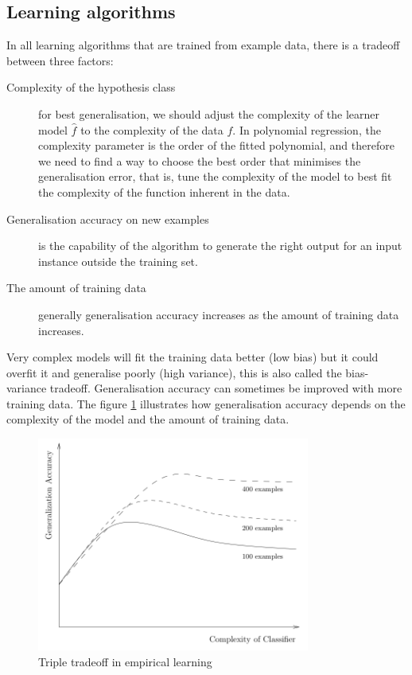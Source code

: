 \subsection{Learning algorithms}
In all learning algorithms that are trained from example data, there is a tradeoff \cite{dietterich2003} between three factors:
\begin{description}
\item[Complexity of the hypothesis class] for best generalisation, we should adjust the complexity of the learner model $\hat{f}$ to the complexity of the data $f$. In polynomial regression, the complexity parameter is the order of the fitted polynomial, and therefore we need to find a way to choose the best order that minimises the generalisation error, that is, tune the complexity of the model to best fit the complexity of the function inherent in the data.
\item[Generalisation accuracy on new examples] is the capability of the algorithm to generate the right output for an input instance outside the training set.
\item[The amount of training data]  generally generalisation accuracy increases as the amount of training data increases.
\end{description}

Very complex models will fit the training data better (low bias) but it could overfit it and generalise poorly (high variance), this is also called the bias-variance tradeoff.  Generalisation accuracy can sometimes be improved with more training data. The figure \ref{fig:tradeoff} illustrates how generalisation accuracy depends on the complexity of the model and the amount of training data.

\begin{figure}[!h]
  \centering
  \includegraphics[width=0.8\textwidth]{img/3tradeoff}
  \caption{Triple tradeoff in empirical learning}
  \label{fig:tradeoff}
\end{figure}

